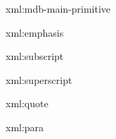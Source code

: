 

\startxmlsetups xml:mdb-main-primitive
\stopxmlsetups


\startxmlsetups xml:emphasis
	{\em {}}
\stopxmlsetups

\startxmlsetups xml:subscript
\stopxmlsetups

\startxmlsetups xml:superscript
\stopxmlsetups

\startxmlsetups xml:quote
\stopxmlsetups

\startxmlsetups xml:para
	\par
\stopxmlsetups

